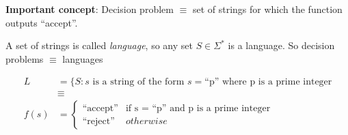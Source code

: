 \textbf{Important concept}: Decision problem $\equiv$ set of strings for which the function outputs ``accept''.

\begin{definition}
    A set of strings is called \emph{language}, so any set $S \in \Sigma^*$ is a language. So decision problems $\equiv$ languages
\end{definition}

\begin{equation*}
    \begin{aligned}
      L &= \{S: s \text{ is a string of the form } s=\text{``p'' where p is a prime integer} \\
      &\equiv \\
      f(s) &=
      \begin{cases}
        \text{``accept''} & \text{if s = ``p'' and p is a prime integer} \\
        \text{``reject''} & otherwise
      \end{cases}
    \end{aligned}
\end{equation*}

\backmatter

